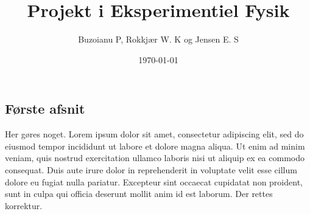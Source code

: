 \documentclass{memoir}
\author{Buzoianu P, Rokkjær W. K og Jensen E. S}
\title{Projekt i Eksperimentiel Fysik}
\date{\today}
\begin{document}
  \maketitle
  \subsection*{Første afsnit}
  Her gøres noget.
  Lorem ipsum dolor sit amet, consectetur adipiscing elit, sed do eiusmod tempor incididunt ut labore et dolore magna aliqua. 
  Ut enim ad minim veniam, quis nostrud exercitation ullamco laboris nisi ut aliquip ex ea commodo consequat. 
  Duis aute irure dolor in reprehenderit in voluptate velit esse cillum dolore eu fugiat nulla pariatur. 
  Excepteur sint occaecat cupidatat non proident, sunt in culpa qui officia deserunt mollit anim id est laborum.
  Der rettes korrektur.
\end{document}

